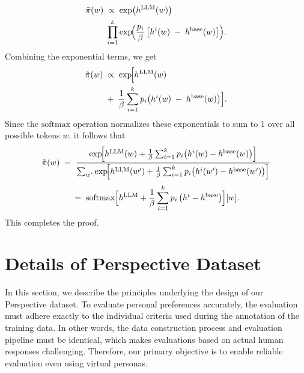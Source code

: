 \begin{equation}
\begin{split}
  \tilde{\pi}(w)
  \;&\propto\;
  \exp\bigl(h^{\text{LLM}}(w)\bigr)
  \;\\ \nonumber &\prod_{i=1}^{k} 
    \exp\!\Bigl(
      \frac{p_i}{\beta}\,\bigl[
         h^i(w) \;-\; h^{\text{base}}(w)
      \bigr]
    \Bigr).
\end{split}
\end{equation}
Combining the exponential terms, we get
\begin{equation}
\begin{split}
  \tilde{\pi}(w)
  \;&\propto\;
  \exp\!\Bigl[
    h^{\text{LLM}}(w)
    \;\\ \nonumber &+\;
    \frac{1}{\beta}\sum_{i=1}^k p_i\bigl(h^i(w) \;-\; h^{\text{base}}(w)\bigr)
  \Bigr].
\end{split}
\end{equation}
Since the \(\mathrm{softmax}\) operation normalizes these exponentials to sum to 1 over all possible tokens \(w\), it follows that
{\tiny
\[
  \tilde{\pi}(w)
  \;=\;
  \frac{
    \exp\!\Bigl[
      h^{\text{LLM}}(w)
      + \frac{1}{\beta}\sum_{i=1}^k p_i\bigl(h^i(w) - h^{\text{base}}(w)\bigr)
    \Bigr]
  }{
    \sum_{w'} 
      \exp\!\Bigl[
        h^{\text{LLM}}(w')
        + \frac{1}{\beta}\sum_{i=1}^k p_i\bigl(h^i(w') - h^{\text{base}}(w')\bigr)
      \Bigr]
  }
\]
}
\[
  \;=\;
  \text{softmax}\Bigl[
     h^{\text{LLM}} 
     + \frac{1}{\beta}\sum_{i=1}^k p_i\,\bigl(h^i - h^{\text{base}}\bigr)
  \Bigr][w].
\]
This completes the proof.

\section{Details of Perspective Dataset}
\label{sec:perspective-details}
In this section, we describe the principles underlying the design of our Perspective dataset. To evaluate personal preferences accurately, the evaluation must adhere exactly to the individual criteria used during the annotation of the training data. In other words, the data construction process and evaluation pipeline must be identical, which makes evaluations based on actual human responses challenging. Therefore, our primary objective is to enable reliable evaluation even using virtual personas.

